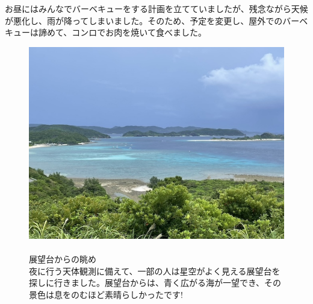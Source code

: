 \documentclass[../main]{subfiles}
\begin{document}
お昼にはみんなでバーベキューをする計画を立てていましたが、残念ながら天候が悪化し、雨が降ってしまいました。そのため、予定を変更し、屋外でのバーベキューは諦めて、コンロでお肉を焼いて食べました。
\begin{figure}[H]
  \begin{minipage}[b]{0.48\columnwidth}
    \centering
    \includegraphics[width=\columnwidth]{figure/tenboudaikaranonagame.jpg}
  \end{minipage}
  \hspace{0.04\columnwidth} %
  \begin{minipage}[b]{0.48\columnwidth}
    \caption{\\
    展望台からの眺め\\
    夜に行う天体観測に備えて、一部の人は星空がよく見える展望台を探しに行きました。展望台からは、青く広がる海が一望でき、その景色は息をのむほど素晴らしかったです!
    }
  \end{minipage}
\end{figure}
\end{document}
